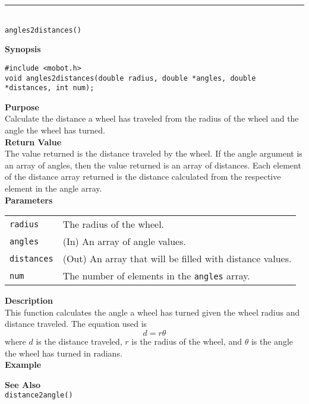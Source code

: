 \noindent
\vspace{5pt}
\rule{4.5in}{0.015in}\\
\noindent
{\LARGE \texttt{angles2distances()}}\\
{}

\noindent
{\bf Synopsis}
\vspace{-8pt}
\begin{verbatim}
#include <mobot.h>
void angles2distances(double radius, double *angles, double *distances, int num);
\end{verbatim}

\noindent
{\bf Purpose}\\
Calculate the distance a wheel has traveled from the radius of the wheel and
the angle the wheel has turned.\\

\noindent
{\bf Return Value}\\
The value returned is the distance traveled by the wheel. If the angle argument is an
array of angles, then the value returned is an array of distances. Each element
of the distance array returned is the distance calculated from the respective
element in the angle array.\\

\noindent
{\bf Parameters}
\vspace{-0.1in}
\begin{description}
\item               
\begin{tabular}{p{15 mm}p{145 mm}}
\texttt{radius} & The radius of the wheel. \\
\texttt{angles} & (In) An array of angle values.\\
\texttt{distances} & (Out) An array that will be filled with distance values.\\
\texttt{num} & The number of elements in the \texttt{angles} array.\\
\end{tabular}
\end{description}

\noindent
{\bf Description}\\
This function calculates the angle a wheel has turned given the wheel 
radius and distance traveled. The equation used is
\begin{equation*}
d = r \theta
\end{equation*}
where $d$ is the distance traveled, $r$ is the radius of the wheel, and $\theta$ is
the angle the wheel has turned in radians.
\\

\noindent
{\bf Example}\\
\noindent

\noindent
{\bf See Also}\\
\texttt{distance2angle()}

